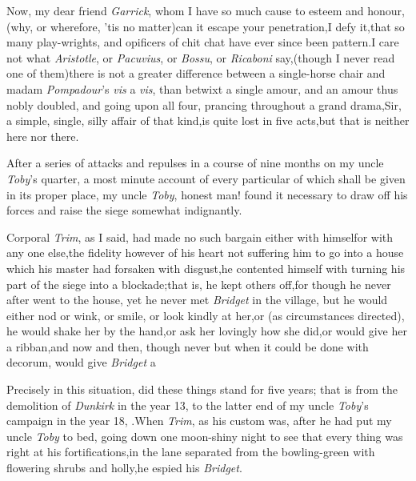 \documentclass{article}
\begin{document}
Now, my dear friend \textit{Garrick}, whom I have so much cause to
esteem and honour,\tsk (why, or wherefore, ’tis no
matter)\tsk can it escape your penetration,\tsk I defy
it,\tsk that so many play-wrights, and
opificers of chit chat have
ever since been 
pattern.\tsh I care not what
\textit{Aristotle}, or \textit{Pacuvius}, or \textit{Bossu}, or
\textit{Ricaboni} say,\tsk (though I never read one of
them)\tsh there is not a greater difference between a
single-horse chair and madam \textit{Pompa\-dour}’s
\textit{vis} a \textit{vis}, than betwixt a single amour, and an amour thus
nobly doubled, and going upon all four, prancing throughout a grand
drama,\tsk Sir, a simple, single, silly affair of that kind,\tsh is
quite lost in five acts,\tsh but that is neither here nor
there.

After a series of attacks and repulses in a course of nine
months on my uncle \textit{Toby}’s quarter, a most minute
account of every particular of which shall be given in its
proper place, my uncle \textit{Toby}, honest man! found it
necessary to draw off his forces and raise the siege somewhat
indignantly.


Corporal \textit{Trim}, as I said, had made no such bargain either with
himself\tsh or with any one else,\tsh the fidelity however of
his heart not suffering him to go into a house which his master had forsaken
with disgust,\tsh he contented himself with turning his part of the
siege into a blockade;\tsk that is, he kept others off,\tsk for though he
never after went to the house, yet he never met \textit{Bridget} in the village,
but he would either nod or wink, or smile, or look kindly at
her,\tsk or (as
circumstances directed), he would shake her by the hand,\tsk or ask her
lovingly how she did,\tsk or would give her a ribban,\tsk and now and then,
though never but when it could be done with decorum, would give \textit{Bridget}
a \tsh{}

Precisely in this situation, did these things stand for five
years; that is from the demolition of \textit{Dunkirk} in the
year 13, to the latter end of my uncle \textit{Toby}’s campaign
in the year 18, .\tsk When \textit{Trim}, as his custom was,
after he had put my uncle \textit{Toby} to bed, going down one
moon-shiny night to see that every thing was right at his
fortifications,\tsh in the lane separated from the bowling-green
with flowering shrubs and holly,\tsk he espied his
\textit{Bridget}.
\end{document}
